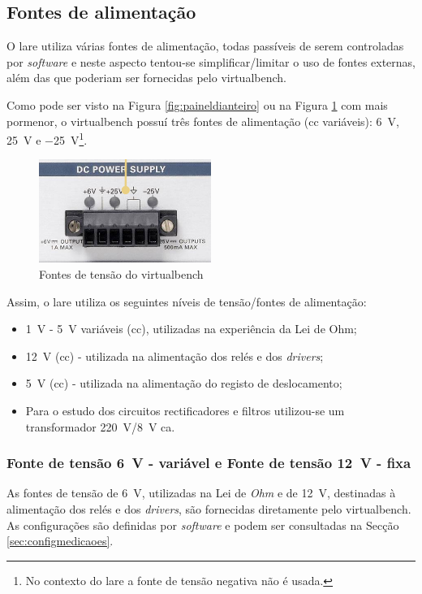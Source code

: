 \subsection{Fontes de alimentação}
\label{sec:fontesalimentacao}

O \acrshort{lare} utiliza várias fontes de alimentação, todas passíveis de serem controladas por \textit{software} e neste aspecto tentou-se simplificar/limitar o uso de fontes externas, além das que poderiam ser fornecidas pelo \acrshort{virtualbench}. 

Como pode ser visto na Figura \ref{fig:paineldianteiro} ou na Figura \ref{fig:promenorfontes} com mais pormenor, o \acrshort{virtualbench} possuí três fontes de alimentação (\acrshort{cc} variáveis): \SI{+6}{\volt}, \SI{+25}{\volt} e \SI{-25}{\volt}\footnote{No contexto do \acrshort{lare} a fonte de tensão negativa não é usada.}.

\begin{figure}[hbtp]
	\centering
	\includegraphics[width=0.5\textwidth]{figures/fontes_VB.png}
	\caption{Fontes de tensão do \acrshort{virtualbench}}
	\label{fig:promenorfontes}
\end{figure}

Assim, o \acrshort{lare} utiliza os seguintes níveis de tensão/fontes de alimentação:
\begin{itemize}
	\item \SI{1}{\volt} - \SI{5}{\volt} variáveis (\acrshort{cc}), utilizadas na experiência da Lei de Ohm;
	\item \SI{12}{\volt} (\acrshort{cc}) - utilizada na alimentação dos relés e dos \textit{drivers};
	\item \SI{5}{\volt} (\acrshort{cc}) - utilizada na alimentação do registo de deslocamento;
	\item Para o estudo dos circuitos rectificadores e filtros utilizou-se um transformador \SI{220}{\volt}/\SI{8}{\volt} \acrshort{ca}.
\end{itemize}

\subsubsection{Fonte de tensão \SI{6}{\volt} - variável e {Fonte de tensão \SI{12}{\volt} - fixa}}
\label{sec:fontes6-12}
As fontes de tensão de \SI{6}{\volt}, utilizadas na Lei de \textit{Ohm} e de \SI{12}{\volt}, destinadas à alimentação dos relés e dos \textit{drivers}, são fornecidas diretamente pelo \acrshort{virtualbench}. As configurações são definidas por \textit{software} e podem ser consultadas na Secção \ref{sec:configmedicaoes}.

